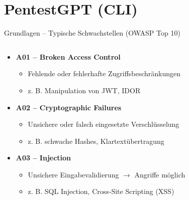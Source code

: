 \documentclass[
	aspectratio=169,	%
	onlytextwidth,		%
	t,					%
	]{beamer}
\begin{document}
\section{PentestGPT (CLI)}

\begin{frame}{Grundlagen – Typische Schwachstellen (OWASP Top 10)}
	\begin{columns}
		\begin{column}[T]{.65\textwidth}
			\begin{itemize}
				\item \textbf{A01 – Broken Access Control}  
				\begin{itemize}
					\item Fehlende oder fehlerhafte Zugriffsbeschränkungen
					\item z. B. Manipulation von JWT, IDOR
				\end{itemize}
				
				\item \textbf{A02 – Cryptographic Failures}  
				\begin{itemize}
					\item Unsichere oder falsch eingesetzte Verschlüsselung
					\item z. B. schwache Hashes, Klartextübertragung
				\end{itemize}
				
				\item \textbf{A03 – Injection}  
				\begin{itemize}
					\item Unsichere Eingabevalidierung $\rightarrow$ Angriffe möglich
					\item z. B. SQL Injection, Cross-Site Scripting (XSS)
				\end{itemize}
			\end{itemize}
			

\end{column}
\end{columns}
\end{frame}
\end{document}
